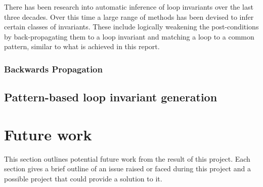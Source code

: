 There has been research into automatic inference of loop invariants over
the last three decades.
Over this time a large range of methods has been devised to infer certain
classes of invariants.
These include logically weakening the post-conditions by back-propagating them
to a loop invariant \cite{infer-postconditions}\cite{infer-dynamic} and
matching a loop to a common pattern\cite{pattern-loop-inv}, similar to what is achieved in this
report.


\subsubsection{Backwards Propagation}

\cite{infer-postconditions}
\cite{infer-dynamic}



\subsection{Pattern-based loop invariant generation}

\cite{pattern-loop-inv}






\section{Future work}

This section outlines potential future work from the result of this project.
Each section gives a brief outline of an issue raised or faced during this
project and a possible project that could provide a solution to it.


